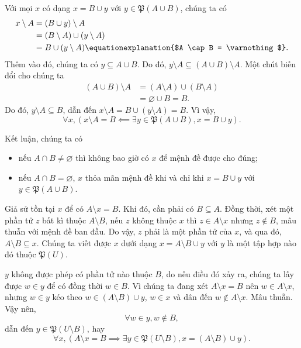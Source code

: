 Với mọi $x$ có dạng $x = B \cup y$ với $y \in \mathfrak{P}(A \cup B)$, chúng ta có
\begin{align*}
   x \setminus A &= (B \cup y) \setminus A \\
      &= (B \setminus A) \cup (y \setminus A) \\
      &= B \cup (y \setminus A) \equationexplanation{$A \cap B = \varnothing$}.
\end{align*}
Thêm vào đó, chúng ta có $y \subseteq A \cup B$. Do đó, $y \setminus A \subseteq (A \cup B) \setminus A$. Một chút biến đổi cho chúng ta 
\begin{align*}
   (A \cup B) \setminus A &= (A \setminus A) \cup (B \setminus A) \\
      &= \varnothing \cup B = B. 
\end{align*}
Do đó, $y \setminus A \subseteq B$, dẫn đến $x \setminus A = B \cup (y \setminus A) = B$. Vì vậy,
$$
   \forall x, \left(x \setminus A = B \impliedby \exists y \in \mathfrak{P}(A \cup B), x = B \cup y\right).
$$

Kết luận, chúng ta có 
\begin{itemize}
   \item nếu $A \cap B \neq \varnothing$ thì không bao giờ có $x$ để mệnh đề được cho đúng;
   \item nếu $A \cap B = \varnothing$, $x$ thỏa mãn mệnh đề khi và chỉ khi $x = B \cup y$ với $y \in \mathfrak{P}(A \cup B)$.
\end{itemize}

\stepSubexercise Giả sử tồn tại $x$ để có $A \setminus x = B$. Khi đó, cần phải có $B \subseteq A$. Đồng thời, xét một phần tử $z$ bất kì thuộc $A \setminus B$, nếu $z$ không thuộc $x$ thì $z \in A \setminus x$ nhưng $z \notin B$, mâu thuẫn với mệnh đề ban đầu. Do vậy, $z$ phải là một phần tử của $x$, và qua đó, $A \setminus B \subseteq x$. Chúng ta viết được $x$ dưới dạng $x = A \setminus B \cup y$ với $y$ là một tập hợp nào đó thuộc $\mathfrak{P}(U)$.

$y$ không được phép có phần tử nào thuộc $B$, do nếu điều đó xảy ra, chúng ta lấy được $w \in y$ để có đồng thời $w \in B$. Vì chúng ta đang xét $A \setminus x = B$ nên $w \in A \setminus x$,  nhưng $w \in y$ kéo theo $w \in (A \setminus B) \cup y$, $w \in x$ và dân đến $w \notin A \setminus x$. Mâu thuẫn. Vậy nên, 
\begin{equation*}
   \forall w \in y, w \notin B,
\end{equation*} 
dẫn đến $y \in \mathfrak{P}(U \setminus B)$, hay $$
   \forall x, \left(A \setminus x = B \implies \exists y \in \mathfrak{P}(U \setminus B), x = (A \setminus B) \cup y\right).
$$

